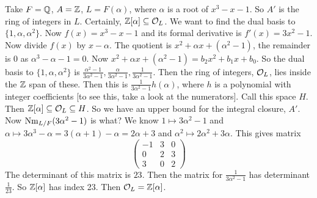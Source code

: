 \begin{ex}
Take $F=\mathbb{Q}$, $A=\mathbb{Z}$, $L=F(\alpha)$, where $\alpha$ is a root of $x^3-x-1$. So $A'$ is the ring of integers in $L$. Certainly, $\mathbb{Z}[\alpha] \subseteq \mathcal{O}_L$. We want to find the dual basis to $\{1,\alpha,\alpha^2\}$. Now $f(x)=x^3-x-1$ and its formal derivative is $f'(x)=3x^2-1$. Now divide $f(x)$ by $x-\alpha$. The quotient is $x^2+\alpha x+ (\alpha^2-1)$, the remainder is 0 as $\alpha^3-\alpha-1=0$.
Now $x^2+\alpha x+ (\alpha^2-1)=b_2x^2+b_1x+b_0$. So the dual basis to $\{1,\alpha,\alpha^2\}$ is $\frac{\alpha^2-1}{3\alpha^2-1}, \frac{\alpha}{3\alpha^2-1},\frac{1}{3\alpha^2-1}$. Then the ring of integers, $\mathcal{O}_L$, lies inside the $\mathbb{Z}$ span of these. Then this is $\frac{1}{3\alpha^2-1}h(\alpha)$, where $h$ is a polynomial with integer coefficients [to see this, take a look at the numerators]. Call this space $H$. Then $\mathbb{Z}[\alpha] \subseteq \mathcal{O}_L \subseteq H$. So we have an upper bound for the integral closure, $A'$. Now $\text{Nm}_{L/F}(3\alpha^2-1)$ is what? We know $1 \mapsto 3\alpha^2-1$ and $\alpha \mapsto 3\alpha^3-\alpha=3(\alpha+1)- \alpha = 2\alpha +3$ and $\alpha^2 \mapsto 2\alpha^2+3\alpha$. This gives matrix 
	\[
	\begin{pmatrix}
	-1 & 3 & 0 \\
	0 & 2 & 3 \\
	3 & 0 & 2 
	\end{pmatrix}
	\]
The determinant of this matrix is $23$. Then the matrix for $\frac{1}{3\alpha^2-1}$ has determinant $\frac{1}{23}$. So $\mathbb{Z}[\alpha]$ has index 23. Then $\mathcal{O}_L=\mathbb{Z}[\alpha]$.  
\end{ex}